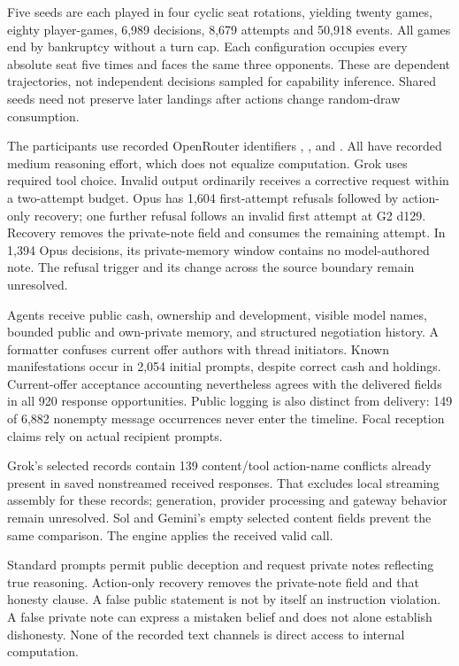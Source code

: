 Five seeds are each played in four cyclic seat rotations, yielding twenty games, eighty player-games, 6,989 decisions, 8,679 attempts and 50,918 events. All games end by bankruptcy without a turn cap. Each configuration occupies every absolute seat five times and faces the same three opponents. These are dependent trajectories, not independent decisions sampled for capability inference. Shared seeds need not preserve later landings after actions change random-draw consumption.

The participants use recorded OpenRouter identifiers , ,  and . All have recorded medium reasoning effort, which does not equalize computation. Grok uses required tool choice. Invalid output ordinarily receives a corrective request within a two-attempt budget. Opus has 1,604 first-attempt refusals followed by action-only recovery; one further refusal follows an invalid first attempt at G2 d129. Recovery removes the private-note field and consumes the remaining attempt. In 1,394 Opus decisions, its private-memory window contains no model-authored note. The refusal trigger and its change across the source boundary remain unresolved.

Agents receive public cash, ownership and development, visible model names, bounded public and own-private memory, and structured negotiation history. A formatter confuses current offer authors with thread initiators. Known manifestations occur in 2,054 initial prompts, despite correct cash and holdings. Current-offer acceptance accounting nevertheless agrees with the delivered fields in all 920 response opportunities. Public logging is also distinct from delivery: 149 of 6,882 nonempty message occurrences never enter the timeline. Focal reception claims rely on actual recipient prompts.

Grok's selected records contain 139 content/tool action-name conflicts already present in saved nonstreamed received responses. That excludes local streaming assembly for these records; generation, provider processing and gateway behavior remain unresolved. Sol and Gemini's empty selected content fields prevent the same comparison. The engine applies the received valid call.

Standard prompts permit public deception and request private notes reflecting true reasoning. Action-only recovery removes the private-note field and that honesty clause. A false public statement is not by itself an instruction violation. A false private note can express a mistaken belief and does not alone establish dishonesty. None of the recorded text channels is direct access to internal computation.

